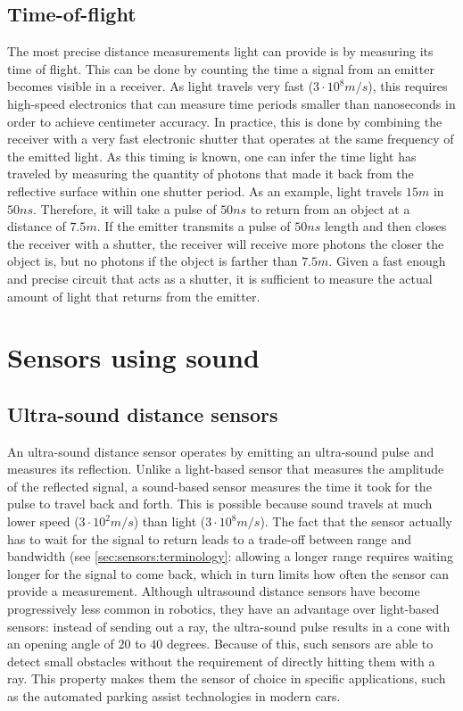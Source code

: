 \subsection{Time-of-flight}

The most precise distance measurements light can provide is by measuring its time of flight. This can be done by counting the time a signal from an emitter becomes visible in a receiver. As light travels very fast ($3\cdot10^8m/s$), this requires high-speed electronics that can measure time periods smaller than nanoseconds in order to achieve centimeter accuracy.
In practice, this is done by combining the receiver with a very fast electronic shutter that operates at the same frequency of the emitted light. As this timing is known, one can infer the time light has traveled by measuring the quantity of photons that made it back from the reflective surface within one shutter period.
As an example, light travels $15m$ in $50ns$. Therefore, it will take a pulse of $50ns$ to return from an object at a distance of $7.5m$. If the emitter transmits a pulse of $50ns$ length and then closes the receiver with a shutter, the receiver will receive more photons the closer the object is, but no photons if the object is farther than $7.5m$. Given a fast enough and precise circuit that acts as a shutter, it is sufficient to measure the actual amount of light that returns from the emitter.

\section{Sensors using sound}\label{sec:sensors:sound}

\subsection{Ultra-sound distance sensors}

An ultra-sound distance sensor operates by emitting an ultra-sound pulse and measures its reflection. Unlike a light-based sensor that measures the amplitude of the reflected signal, a sound-based sensor measures the time it took for the pulse to travel back and forth.
This is possible because sound travels at much lower speed ($3\cdot10^2m/s$) than light ($3\cdot10^8m/s$). The fact that the sensor actually has to wait for the signal to return leads to a trade-off between range and bandwidth (see \cref{sec:sensors:terminology}: allowing a longer range requires waiting longer for the signal to come back, which in turn limits how often the sensor can provide a measurement.
Although ultrasound distance sensors have become progressively less common in robotics, they have an advantage over light-based sensors: instead of sending out a ray, the ultra-sound pulse results in a cone with an opening angle of $20$ to $40$ degrees. Because of this, such sensors are able to detect small obstacles without the requirement of directly hitting them with a ray. This property makes them the sensor of choice in specific applications, such as the automated parking assist technologies in modern cars.

